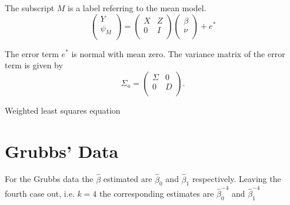 \documentclass[12pt, a4paper]{article}
\begin{document}
The subscript $M$ is a label referring to the mean model.
\begin{equation}
\left(%
\begin{array}{c}
Y \\
\psi_{M} \\
\end{array}%
\right) = \left(
\begin{array}{cc}
X & Z \\
0 & I \\
\end{array}\right) \left(%
\begin{array}{c}
\beta \\
\nu \\
\end{array}%
\right)+ e^{*}
\end{equation}




The error term $e^{*}$ is normal with mean zero. The variance matrix of the error term is given by
\begin{equation}
\Sigma_{a} = \left(%
\begin{array}{cc}
\Sigma & 0 \\
0 & D \\
\end{array}%
\right).
\end{equation}



Weighted least squares equation










\section{Grubbs' Data} %

For the Grubbs data the $\hat{\beta}$ estimated are
$\hat{\beta}_{0}$ and $\hat{\beta}_{1}$ respectively. Leaving the
fourth case out, i.e. $k=4$ the corresponding estimates are
$\hat{\beta}_{0}^{-4}$ and $\hat{\beta}_{1}^{-4}$
\end{document}
